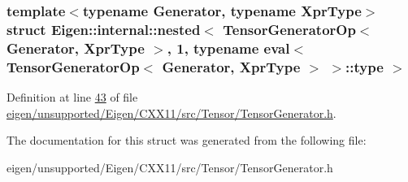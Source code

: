 \subsubsection*{template$<$typename Generator, typename Xpr\+Type$>$\newline
struct Eigen\+::internal\+::nested$<$ Tensor\+Generator\+Op$<$ Generator, Xpr\+Type $>$, 1, typename eval$<$ Tensor\+Generator\+Op$<$ Generator, Xpr\+Type $>$ $>$\+::type $>$}



Definition at line \hyperlink{eigen_2unsupported_2_eigen_2_c_x_x11_2src_2_tensor_2_tensor_generator_8h_source_l00043}{43} of file \hyperlink{eigen_2unsupported_2_eigen_2_c_x_x11_2src_2_tensor_2_tensor_generator_8h_source}{eigen/unsupported/\+Eigen/\+C\+X\+X11/src/\+Tensor/\+Tensor\+Generator.\+h}.



The documentation for this struct was generated from the following file\+:\begin{DoxyCompactItemize}
\item 
eigen/unsupported/\+Eigen/\+C\+X\+X11/src/\+Tensor/\+Tensor\+Generator.\+h\end{DoxyCompactItemize}
